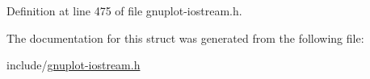Definition at line 475 of file gnuplot-\/iostream.\+h.



The documentation for this struct was generated from the following file\+:\begin{DoxyCompactItemize}
\item 
include/\hyperlink{gnuplot-iostream_8h}{gnuplot-\/iostream.\+h}\end{DoxyCompactItemize}
